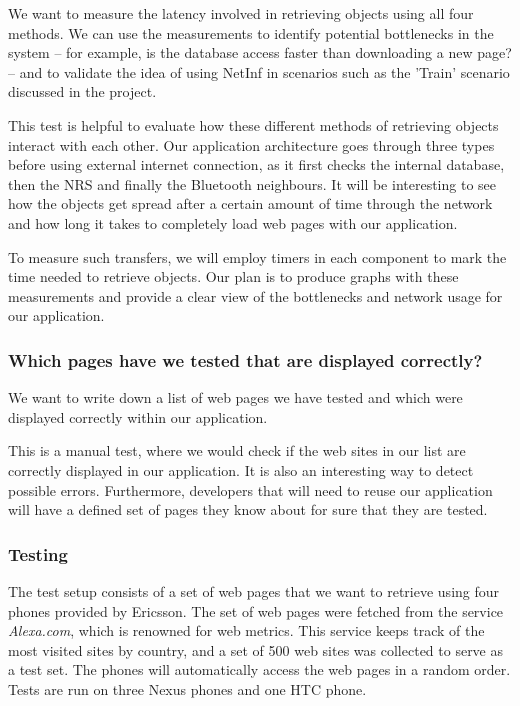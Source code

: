 We want to measure the latency involved in retrieving objects using all four methods. We can use the measurements to identify potential bottlenecks in the system -- for example, is the database access faster than downloading a new page? -- and to validate the idea of using NetInf in scenarios such as the 'Train' scenario discussed in the project.

This test is helpful to evaluate how these different methods of retrieving objects interact with each other. Our application architecture goes through three types before using external internet connection, as it first checks the internal database, then the NRS and finally the Bluetooth neighbours. It will be interesting to see how the objects get spread after a certain amount of time through the network and how long it takes to completely load web pages with our application.

To measure such transfers, we will employ timers in each component to mark the time needed to retrieve objects. Our plan is to produce graphs with these measurements and provide a clear view of the bottlenecks and network usage for our application.

\subsubsection{Which pages have we tested that are displayed correctly?}
We want to write down a list of web pages we have tested and which were displayed correctly within our application.

This is a manual test, where we would check if the web sites in our list are correctly displayed in our application. It is also an interesting way to detect possible errors. Furthermore, developers that will need to reuse our application will have a defined set of pages they know about for sure that they are tested.

\subsubsection{Testing}
The test setup consists of a set of web pages that we want to retrieve using four phones provided by Ericsson. The set of web pages were fetched from the service \textit{Alexa.com}, which is renowned for web metrics. This service keeps track of the most visited sites by country, and a set of 500 web sites was collected to serve as a test set. The phones will automatically access the web pages in a random order. Tests are run on three Nexus phones and one HTC phone.

